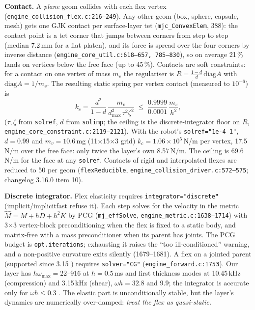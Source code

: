 \documentclass[10pt,twocolumn]{article}
\newcommand{\code}[1]{\texttt{\small #1}}
\newcommand{\src}[1]{\texttt{\footnotesize #1}}
\newcommand{\Nu}{N/\textmu m}
\begin{document}
\textbf{Contact.} A \emph{plane} geom collides with each flex vertex (\src{engine\_collision\_flex.c:216--249}). Any
other geom (box, sphere, capsule, mesh) gets one GJK contact per surface-layer tet (\code{mjc\_ConvexElem}, 388):
the contact point is a tet corner that jumps between corners from step to step (median 7.2\,mm for a flat platen), and
its force is spread over the four corners by inverse distance (\src{engine\_core\_util.c:618--657, 785--830}), so
on average 21\,\% lands on vertices below the free face (up to 45\,\%). Contacts are soft constraints: for a contact on
one vertex of mass $m_v$ the regulariser is $R=\frac{1-d}{d}\,\mathrm{diag}A$ with $\mathrm{diag}A=1/m_v$. The resulting static
spring per vertex contact (measured to $10^{-6}$) is
\begin{equation}
k_c=\frac{d^2}{1-d}\,\frac{m_v}{d_{\max}^2\,\tau^2\zeta^2}\;\le\;\frac{0.9999}{0.0001}\,\frac{m_v}{h^2},
\label{eq:kc}
\end{equation}
($\tau,\zeta$ from \code{solref}, $d$ from \code{solimp}; the ceiling is the discrete-integrator floor on $R$,
\src{engine\_core\_constraint.c:2119--2121}). With the robot's \code{solref="1e-4 1"}, $d=0.99$ and
$m_v=10.6$\,mg (11$\times$15$\times$3 grid) $k_c=1.06\times10^5$\,N/m per vertex, 17.5\,\Nu{} over the free face:
only twice the layer's own 8.57\,\Nu. The ceiling is 69.6\,\Nu{} for the face at any \code{solref}. Contacts of
rigid and interpolated flexes are reduced to 50 per geom (\code{flexReducible},
\src{engine\_collision\_driver.c:572--575}; changelog 3.16.0 item 10).

\textbf{Discrete integrator.} Flex elasticity requires \code{integrator="discrete"} (implicit/implicitfast refuse it).
Each step solves for the velocity in the metric $\hat M=M+hD+h^2K$ by PCG (\code{mj\_effSolve},
\src{engine\_metric.c:1638--1714}) with 3$\times$3 vertex-block preconditioning when the flex is fixed to a static
body, and matrix-free with a mass preconditioner when its parent has joints. The PCG budget is
\code{opt.iterations}; exhausting it raises the ``too ill-conditioned'' warning, and a non-positive curvature exits
silently (1679--1681). A flex on a jointed parent (supported since 3.15 \cite{pr3618}) requires \code{solver="CG"} (\src{engine\_forward.c:1753}). Our layer
has $h\omega_{\max}=22$--916 at $h=0.5$\,ms and first thickness modes at 10.45\,kHz (compression) and 3.15\,kHz (shear),
$\omega h=32.8$ and 9.9; the integrator is accurate only for $\omega h\le0.3$ \cite{roqsim}. The elastic part is
unconditionally stable, but the layer's dynamics are numerically over-damped: \emph{treat the flex as quasi-static.}
\end{document}
